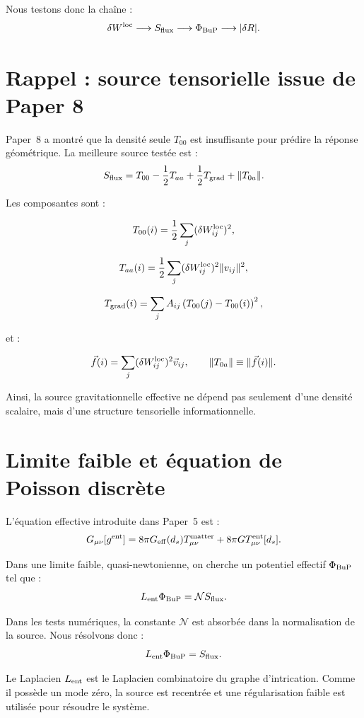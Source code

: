 \documentclass[11pt,a4paper]{article}
\begin{document}
Nous testons donc la chaîne :
\[
\delta W^{\rm loc}
\longrightarrow
S_{\rm flux}
\longrightarrow
\Phi_{\rm BuP}
\longrightarrow
|\delta R|.
\]

\section{Rappel : source tensorielle issue de Paper 8}

Paper~8 a montré que la densité seule \(T_{00}\) est insuffisante pour prédire
la réponse géométrique. La meilleure source testée est :
\[
S_{\rm flux}
=
T_{00}
-\frac12T_{aa}
+
\frac12T_{\rm grad}
+
\|T_{0a}\|.
\]

Les composantes sont :

\[
T_{00}(i)
=
\frac12
\sum_j
(\delta W_{ij}^{\rm loc})^2,
\]

\[
T_{aa}(i)
=
\frac12
\sum_j
(\delta W_{ij}^{\rm loc})^2
\|v_{ij}\|^2,
\]

\[
T_{\rm grad}(i)
=
\sum_j
A_{ij}
\left(
T_{00}(j)-T_{00}(i)
\right)^2,
\]

et :

\[
\vec f(i)
=
\sum_j
(\delta W_{ij}^{\rm loc})^2
\vec v_{ij},
\qquad
\|T_{0a}\|\equiv \|\vec f(i)\|.
\]

Ainsi, la source gravitationnelle effective ne dépend pas seulement d'une
densité scalaire, mais d'une structure tensorielle informationnelle.

\section{Limite faible et équation de Poisson discrète}

L'équation effective introduite dans Paper~5 est :
\[
G_{\mu\nu}[g^{\rm ent}]
=
8\pi G_{\rm eff}(d_s)T_{\mu\nu}^{\rm matter}
+
8\pi G T_{\mu\nu}^{\rm ent}[d_s].
\]

Dans une limite faible, quasi-newtonienne, on cherche un potentiel effectif
\(\Phi_{\rm BuP}\) tel que :
\[
L_{\rm ent}\Phi_{\rm BuP}
=
\mathcal{N}S_{\rm flux}.
\]

Dans les tests numériques, la constante \(\mathcal{N}\) est absorbée dans la
normalisation de la source. Nous résolvons donc :
\[
L_{\rm ent}\Phi_{\rm BuP}
=
S_{\rm flux}.
\]

Le Laplacien \(L_{\rm ent}\) est le Laplacien combinatoire du graphe
d'intrication. Comme il possède un mode zéro, la source est recentrée et une
régularisation faible est utilisée pour résoudre le système.
\end{document}
